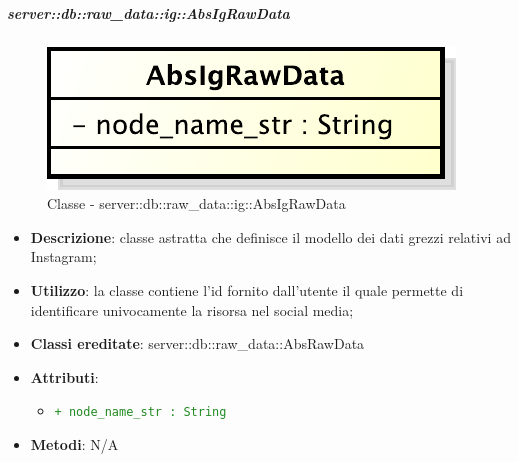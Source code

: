 		\subparagraph{server::db::raw\_data::ig::AbsIgRawData} %
		\label{subp:server_db_raw_data_ig_absigrawdata}
			\begin{figure}[htbp]
				\centering
				\centerline{\includegraphics[scale=0.75]{./images/server/classes/db/abs_ig_raw_data.pdf}}
				\caption{Classe - server::db::raw\_data::ig::AbsIgRawData}
			\end{figure}
			\begin{itemize}
				\item \textbf{Descrizione}: classe astratta che definisce il modello dei dati grezzi relativi ad Instagram;
				\item \textbf{Utilizzo}: la classe contiene l'id fornito dall'utente il quale permette di identificare univocamente la risorsa nel social media;
				\item \textbf{Classi ereditate}: server::db::raw\_data::AbsRawData
				\item \textbf{Attributi}:
					\begin{itemize}
						\item \textcolor{forestgreen}{\texttt{+ node\_name\_str : String}}
					\end{itemize}
				\item \textbf{Metodi}: N/A
			\end{itemize}


